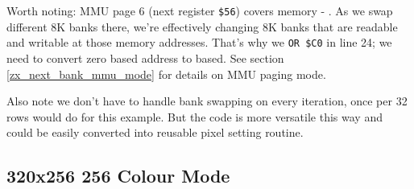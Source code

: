 \documentclass[12pt,twoside,openright,a4paper]{book}
\begin{document}
Worth noting: MMU page 6 (next register {\tt \$56}) covers memory  - . As we swap different 8K banks there, we're effectively changing 8K banks that are readable and writable at those memory addresses. That's why we {\tt OR \$C0} in line 24; we need to convert zero based address to  based. See section \ref{zx_next_bank_mmu_mode} for details on MMU paging mode.

Also note we don't have to handle bank swapping on every iteration, once per 32 rows would do for this example. But the code is more versatile this way and could be easily converted into reusable pixel setting routine.


\pagebreak
\subsection{320x256 256 Colour Mode}
\end{document}
